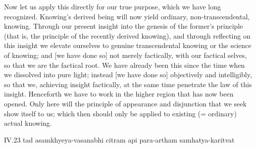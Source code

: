 Now let us apply this directly for our true purpose,
which we have long recognized.
Knowing's derived being will now yield
ordinary, non-transcendental, knowing.
Through our present insight into
the genesis of the former's principle
(that is, the principle of the recently derived knowing),
and through reflecting on this insight
we elevate ourselves to genuine transcendental knowing
or the science of knowing;
and [we have done so] not merely factically,
with our factical selves,
so that we are the factical root.
We have already been this since
the time when we dissolved into pure light;
instead [we have done so] objectively and intelligibly,
so that we, achieving insight factically,
at the same time penetrate the law of this insight.
Henceforth we have to work in the higher region
that has now been opened.
Only here will the principle of
appearance and disjunction
that we seek show itself to us;
which then should only be applied
to existing (= ordinary) actual knowing.

IV.23
tad asamkhyeya-vasanabhi citram api para-artham samhatya-karitvat

